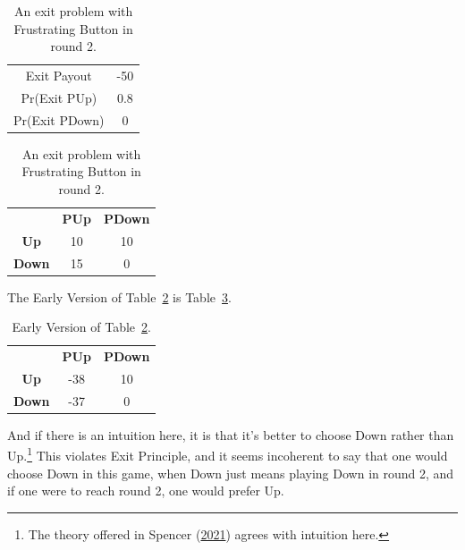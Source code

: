 \documentclass[
  12pt,
  letterpaper,
  DIV=11,
  numbers=noendperiod]{scrreprt}
\begin{document}
\begin{table}

\caption{\label{tbl-frustrating-exit}An exit problem with Frustrating
Button in round 2.}\begin{minipage}[t]{0.50\linewidth}

{\centering 

\begin{tabular}[t]{cc}
\toprule
Exit Payout & -50\\
Pr(Exit \textbar{} PUp) & 0.8\\
Pr(Exit \textbar{} PDown) & 0\\
\bottomrule
\end{tabular}

}

\end{minipage}%
%
\begin{minipage}[t]{0.50\linewidth}

{\centering 

\begin{tabular}[t]{ccc}
\toprule
 & \textbf{PUp} & \textbf{PDown}\\
\textbf{Up} & 10 & 10\\
\textbf{Down} & 15 & 0\\
\bottomrule
\end{tabular}

}

\end{minipage}%

\end{table}

The Early Version of Table~\ref{tbl-frustrating-exit} is
Table~\ref{tbl-ev-fe}.

\hypertarget{tbl-ev-fe}{}
\begin{longtable}[]{@{}ccc@{}}
\caption{\label{tbl-ev-fe}Early Version of
Table~\ref{tbl-frustrating-exit}.}\tabularnewline
\toprule\noalign{}
\endfirsthead
\endhead
\bottomrule\noalign{}
\endlastfoot
& \textbf{PUp} & \textbf{PDown} \\
\textbf{Up} & -38 & 10 \\
\textbf{Down} & -37 & 0 \\
\end{longtable}

\newpage

And if there is an intuition here, it is that it's better to choose Down
rather than Up.\footnote{The theory offered in Spencer
  (\protect\hyperlink{ref-Spencer2021b}{2021}) agrees with intuition
  here.} This violates Exit Principle, and it seems incoherent to say
that one would choose Down in this game, when Down just means playing
Down in round 2, and if one were to reach round 2, one would prefer Up.
\end{document}
